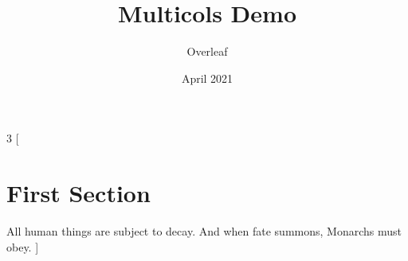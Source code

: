 \documentclass{article}
\title{Multicols Demo}
\author{Overleaf}
\date{April 2021}
\begin{document}
\maketitle

\begin{multicols}{3}
[
\section{First Section}
All human things are subject to decay. And when fate summons, Monarchs must obey.
]
\blindtext\blindtext
\end{multicols}
\end{document}
